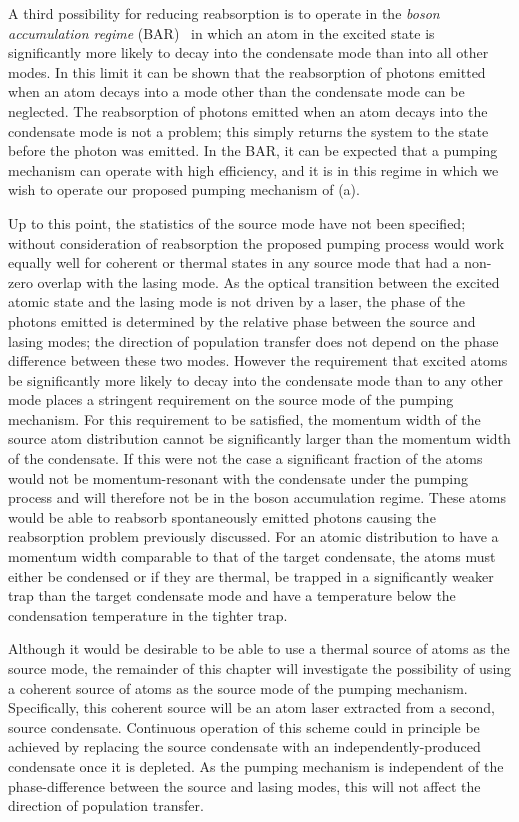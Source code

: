 A third possibility for reducing reabsorption is to operate in the \emph{boson accumulation regime} (BAR)~\citep{Cirac:1996rr,Floegel:2001} in which an atom in the excited state is significantly more likely to decay into the condensate mode than into all other modes.  In this limit it can be shown that the reabsorption of photons emitted when an atom decays into a mode other than the condensate mode can be neglected.  The reabsorption of photons emitted when an atom decays into the condensate mode is not a problem; this simply returns the system to the state before the photon was emitted.  In the BAR, it can be expected that a pumping mechanism can operate with high efficiency, and it is in this regime in which we wish to operate our proposed pumping mechanism of (a).

Up to this point, the statistics of the source mode have not been specified; without consideration of reabsorption the proposed pumping process would work equally well for coherent or thermal states in any source mode that had a non-zero overlap with the lasing mode.  As the optical transition between the excited atomic state and the lasing mode is not driven by a laser, the phase of the photons emitted is determined by the relative phase between the source and lasing modes; the direction of population transfer does not depend on the phase difference between these two modes. However the requirement that excited atoms be significantly more likely to decay into the condensate mode than to any other mode places a stringent requirement on the source mode of the pumping mechanism.  For this requirement to be satisfied, the momentum width of the source atom distribution cannot be significantly larger than the momentum width of the condensate.  If this were not the case a significant fraction of the atoms would not be momentum-resonant with the condensate under the pumping process and will therefore not be in the boson accumulation regime.  These atoms would be able to reabsorb spontaneously emitted photons causing the reabsorption problem previously discussed.  For an atomic distribution to have a momentum width comparable to that of the target condensate, the atoms must either be condensed or if they are thermal, be trapped in a significantly weaker trap than the target condensate mode and have a temperature below the condensation temperature in the tighter trap.  

Although it would be desirable to be able to use a thermal source of atoms as the source mode, the remainder of this chapter will investigate the possibility of using a coherent source of atoms as the source mode of the pumping mechanism.  Specifically, this coherent source will be an atom laser extracted from a second, source condensate.  Continuous operation of this scheme could in principle be achieved by replacing the source condensate with an independently-produced condensate once it is depleted.  As the pumping mechanism is independent of the phase-difference between the source and lasing modes, this will not affect the direction of population transfer.


